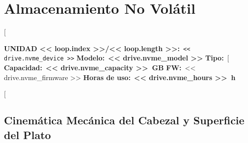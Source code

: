 \documentclass[11pt, a4paper, final]{article}
\newcommand{\mv}[1]{\textcolor{AMPrimary}{\textbf{#1}}}
\begin{document}
\newpage


%
%
\section{Almacenamiento No Volátil}

[%

\begin{componentinfo}
  \small
  \textbf{UNIDAD << loop.index >>/<< loop.length >>:}\ \texttt{<< drive.nvme_device >>}\hfill
  \textbf{Modelo:}\ \mv{<< drive.nvme_model >>}\hfill
  \textbf{Tipo:}\ [%
  \textbf{Capacidad:}\ \mv{<< drive.nvme_capacity >>\ GB}\hfill
  \textbf{FW:}\ << drive.nvme_firmware >>\hfill
  \textbf{Horas de uso:}\ \mv{<< drive.nvme_hours >>\ h}
\end{componentinfo}

\vspace{0.5cm}

[%

\subsection*{Cinemática Mecánica del Cabezal y Superficie del Plato}
\end{document}
